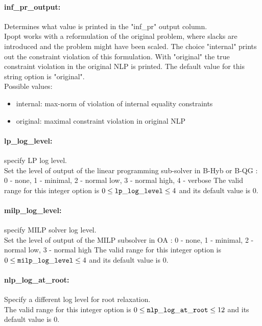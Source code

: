 \paragraph{inf\_pr\_output:}\label{opt:inf_pr_output} Determines what value is printed in the "inf\_pr" output column. \\
 Ipopt works with a reformulation of the original problem, where slacks are introduced and the problem might have been scaled.  The choice "internal" prints out the constraint violation of this formulation. With "original" the true constraint violation in the original NLP is printed. The default value for this string option is "original".
\\ 
Possible values:
\begin{itemize}
   \item internal: max-norm of violation of internal equality constraints
   \item original: maximal constraint violation in original NLP
\end{itemize}

\paragraph{lp\_log\_level:}\label{opt:lp_log_level} specify LP log level. \\
 Set the level of output of the linear programming sub-solver in B-Hyb or B-QG : 0 - none, 1 - minimal, 2 - normal low, 3 - normal high, 4 - verbose The valid range for this integer option is
$0 \le {\tt lp\_log\_level } \le 4$
and its default value is $0$.


\paragraph{milp\_log\_level:}\label{opt:milp_log_level} specify MILP solver log level. \\
 Set the level of output of the MILP subsolver in OA : 0 - none, 1 - minimal, 2 - normal low, 3 - normal high The valid range for this integer option is
$0 \le {\tt milp\_log\_level } \le 4$
and its default value is $0$.


\paragraph{nlp\_log\_at\_root:}\label{opt:nlp_log_at_root}  Specify a different log level for root relaxation. \\
 The valid range for this integer option is
$0 \le {\tt nlp\_log\_at\_root } \le 12$
and its default value is $0$.


